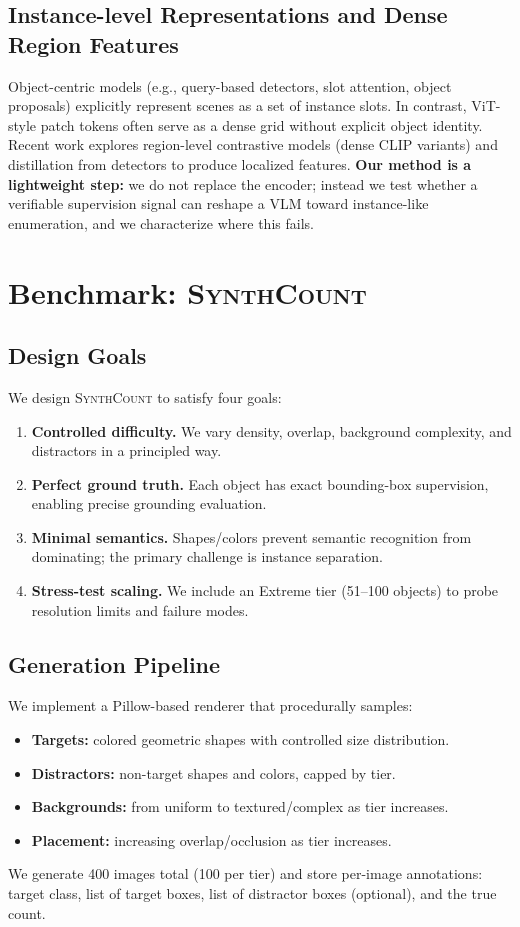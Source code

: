\documentclass[10pt]{article}
\newcommand{\dataset}{\textsc{SynthCount}\xspace}         %
\begin{document}
\subsection{Instance-level Representations and Dense Region Features}
Object-centric models (e.g., query-based detectors, slot attention, object proposals) explicitly represent scenes as a set of instance slots.
In contrast, ViT-style patch tokens often serve as a dense grid without explicit object identity.
Recent work explores region-level contrastive models (dense CLIP variants) and distillation from detectors to produce localized features.
\textbf{Our method is a lightweight step:} we do not replace the encoder; instead we test whether a verifiable supervision signal can reshape a VLM toward instance-like enumeration, and we characterize where this fails.

\section{Benchmark: \dataset}
\subsection{Design Goals}
We design \dataset to satisfy four goals:
\begin{enumerate}[leftmargin=1.2em]
  \item \textbf{Controlled difficulty.} We vary density, overlap, background complexity, and distractors in a principled way.
  \item \textbf{Perfect ground truth.} Each object has exact bounding-box supervision, enabling precise grounding evaluation.
  \item \textbf{Minimal semantics.} Shapes/colors prevent semantic recognition from dominating; the primary challenge is instance separation.
  \item \textbf{Stress-test scaling.} We include an Extreme tier (51--100 objects) to probe resolution limits and failure modes.
\end{enumerate}

\subsection{Generation Pipeline}
We implement a Pillow-based renderer that procedurally samples:
\begin{itemize}[leftmargin=1.2em]
  \item \textbf{Targets:} colored geometric shapes with controlled size distribution.
  \item \textbf{Distractors:} non-target shapes and colors, capped by tier.
  \item \textbf{Backgrounds:} from uniform to textured/complex as tier increases.
  \item \textbf{Placement:} increasing overlap/occlusion as tier increases.
\end{itemize}
We generate 400 images total (100 per tier) and store per-image annotations: target class, list of target boxes, list of distractor boxes (optional), and the true count.
\end{document}
